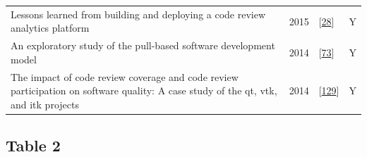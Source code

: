 \documentclass[]{book}
\begin{document}
\begin{longtable}[]{@{}llll@{}}
\begin{minipage}[t]{0.63\columnwidth}
Lessons learned from building and deploying a code review analytics
platform\strut
\end{minipage} & \begin{minipage}[t]{0.03\columnwidth}\raggedright\strut
2015\strut
\end{minipage} & \begin{minipage}[t]{0.14\columnwidth}\raggedright\strut
{[}\protect\hyperlink{ref-bird2015lessons}{28}{]}\strut
\end{minipage} & \begin{minipage}[t]{0.09\columnwidth}\raggedright\strut
Y\strut
\end{minipage}\tabularnewline
\begin{minipage}[t]{0.63\columnwidth}\raggedright\strut
An exploratory study of the pull-based software development model\strut
\end{minipage} & \begin{minipage}[t]{0.03\columnwidth}\raggedright\strut
2014\strut
\end{minipage} & \begin{minipage}[t]{0.14\columnwidth}\raggedright\strut
{[}\protect\hyperlink{ref-gousios2014exploratory}{73}{]}\strut
\end{minipage} & \begin{minipage}[t]{0.09\columnwidth}\raggedright\strut
Y\strut
\end{minipage}\tabularnewline
\begin{minipage}[t]{0.63\columnwidth}\raggedright\strut
The impact of code review coverage and code review participation on
software quality: A case study of the qt, vtk, and itk projects\strut
\end{minipage} & \begin{minipage}[t]{0.03\columnwidth}\raggedright\strut
2014\strut
\end{minipage} & \begin{minipage}[t]{0.14\columnwidth}\raggedright\strut
{[}\protect\hyperlink{ref-mcintosh2014impact}{129}{]}\strut
\end{minipage} & \begin{minipage}[t]{0.09\columnwidth}\raggedright\strut
Y\strut
\end{minipage}\tabularnewline
\bottomrule
\end{longtable}

\subsection{Table 2}\label{table-2}
\end{document}
